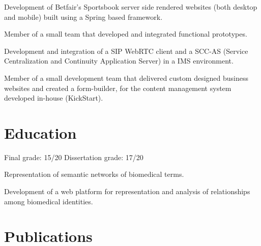 \documentclass[]{andre-vechina-resume}
\begin{document}
\begin{tightemize}
\item
Development of Betfair's Sportsbook server side rendered websites (both desktop and mobile) built using a Spring based framework.
\end{tightemize}
\sectionsep

\begin{tightemize}
\item
Member of a small team that developed and integrated functional prototypes.
\item
Development and integration of a SIP WebRTC client and a SCC-AS (Service Centralization and Continuity Application Server) in a IMS environment.
\end{tightemize}
\sectionsep

\begin{tightemize}
\item
Member of a small development team that delivered custom designed business websites and created a form-builder, for the content management system developed in-house (KickStart).
\end{tightemize}

\section{Education}

Final grade: {\color{subheadings} 15/20} \tdot Dissertation grade: {\color{subheadings} 17/20}\\
\begin{tightemize}
\item
Representation of semantic networks of biomedical terms.
\item
Development of a web platform for representation and analysis of relationships among biomedical identities.
\end{tightemize}

\section{Publications}



\nocite{*}
\end{document}
